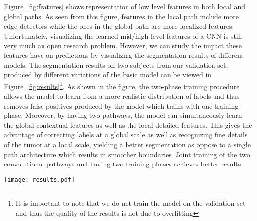 \documentclass[final,5p,times,twocolumn]{elsarticle}
\begin{document}
{Figure~\ref{fig:features} shows representation of low level features in both local and global paths. As seen from this figure,  features in the local path include more edge detectors while the ones in the global path are more localized features. Unfortunately, visualizing the learned mid/high level features of a CNN is still very much an open research problem. However, we can study the impact these features have on predictions by visualizing the segmentation results of different models.
The segmentation results on two subjects from our validation set, produced by different variations of the basic model can be viewed in Figure~\ref{fig:results}\footnote{It is important to note that we do not train the model on the validation set and thus the quality of the results is not due to overfitting}. As shown in the figure, the two-phase training procedure allows the model to learn from a more realistic distribution of labels and thus removes false positives produced by the model which trains with one training phase.  Moreover, by having two pathways, the model can simultaneously learn the global contextual features as well as the local detailed features. This gives the advantage of correcting labels at a global scale as well as recognizing fine details of the tumor at a local scale, yielding a better segmentation as oppose to a single path architecture which results in smoother boundaries. Joint training of the two convolutional pathways and having two training phases achieves better results.










 

\begin{figure*}[p!]

\centering

\texttt{[image: results.pdf]}

\caption{Visual results from our CNN architectures from the Axial view. For each sub-figure, the top row from left to right shows T1C modality, the conventional one path CNN, the Conventional CNN with two training phases, and the \textsc{TwoPathCNN} model.  The second row from left to right shows the ground truth,  \textsc{LocalCascadeCNN} model, the \textsc{MFCascadeCNN} model and the \textsc{InputCascadeCNN}. The color codes are as follows:  \textcolor[RGB]{135,213,120}{$\blacksquare$} edema, \textcolor[RGB]{225,225,95}{$\blacksquare$} enhanced tumor,
\textcolor[RGB]{246,145,139}{$\blacksquare$} necrosis,
\textcolor[RGB]{124,167,208}{$\blacksquare$} non-enhanced tumor.}
\label{fig:results}
\end{figure*} 

}
\end{document}

